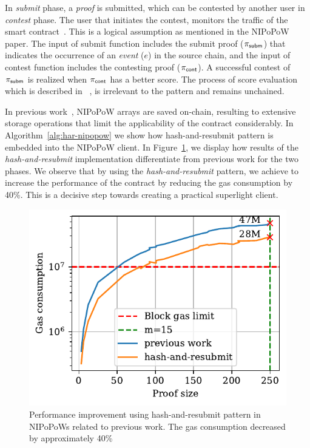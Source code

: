 In \emph{submit} phase, a \emph{proof} is submitted, which can be contested by
another user in \emph{contest} phase. The user that initiates the contest,
monitors the traffic of the smart contract~\cite{nipopows}. This is a logical
assumption as mentioned in the NIPoPoW paper. The input of \textsf{submit}
function includes the submit proof ($\mathsf{\pi_{subm}}$) that indicates the occurrence of an
\emph{event} ($e$) in the source chain, and the input of \textsf{contest}
function includes the contesting proof ($\mathsf{\pi_{cont}}$). A successful contest of $\mathsf{\pi_{subm}}$
is realized when $\mathsf{\pi_{cont}}$ has a better score. The process of score evaluation
which is described in ~\cite{nipopows}, is irrelevant to the pattern and
remains unchained.

In previous work~\cite{gglou}, NIPoPoW arrays are saved on-chain, resulting to
extensive storage operations that limit the applicability of the contract
considerably. In Algorithm~\ref{alg:har-nipopow} we show how hash-and-resubmit
pattern is embedded into the NIPoPoW client. In Figure~\ref{fig:har-nipopow},
we display how results of the \emph{hash-and-resubmit} implementation
differentiate from previous work for the two phases. We observe that by using
the \emph{hash-and-resubmit} pattern, we achieve to increase the performance of
the contract by reducing the gas consumption by 40\%. This is a decisive step
towards creating a practical superlight client.


\begin{figure}[h]
    \begin{center}
        \includegraphics[width=1\columnwidth]{figures/har-nipopows.pdf}
    \end{center}
    \caption{Performance improvement using hash-and-resubmit pattern in
    NIPoPoWs related to previous work. The gas consumption decreased by
    approximately 40\%}
    \label{fig:har-nipopow}
\end{figure}
